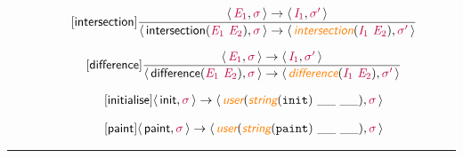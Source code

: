 \documentclass[10pt,leqno,fleqn]{article}
\newcommand{\artVariable}[1]{\mbox{\color{purple}\em #1\/}}
\newcommand{\artConstructor}[1]{\mbox{\sf #1}}
\newcommand{\artCaseInsensitiveLiteral}[1]{\mbox{\tt #1}}
\newcommand{\artSpecial}[1]{\mbox{\color{orange}\sf\em #1}}
\begin{document}
\begin{equation}
\tag*{[\artConstructor{\sf intersection}]}
\begin{split}\frac{\langle\, \artVariable{E$_{1}$}, \artVariable{$\sigma$}\,\rangle \rightarrow \langle\, \artVariable{I$_{1}$}, \artVariable{$\sigma$\/$^\prime$}\,\rangle }{\langle\, \artConstructor{\sf intersection}(\artVariable{E$_{1}$}\ \artVariable{E$_{2}$}), \artVariable{$\sigma$}\,\rangle \rightarrow \langle\, \artSpecial{intersection}(\artVariable{I$_{1}$}\ \artVariable{E$_{2}$}), \artVariable{$\sigma$\/$^\prime$}\,\rangle }
\end{split}
\end{equation}

\begin{equation}
\tag*{[\artConstructor{\sf difference}]}
\begin{split}\frac{\langle\, \artVariable{E$_{1}$}, \artVariable{$\sigma$}\,\rangle \rightarrow \langle\, \artVariable{I$_{1}$}, \artVariable{$\sigma$\/$^\prime$}\,\rangle }{\langle\, \artConstructor{\sf difference}(\artVariable{E$_{1}$}\ \artVariable{E$_{2}$}), \artVariable{$\sigma$}\,\rangle \rightarrow \langle\, \artSpecial{difference}(\artVariable{I$_{1}$}\ \artVariable{E$_{2}$}), \artVariable{$\sigma$\/$^\prime$}\,\rangle }
\end{split}
\end{equation}

\begin{equation}
\tag*{[\artConstructor{\sf initialise}]}
\begin{split}\langle\, \artConstructor{\sf init}, \artVariable{$\sigma$}\,\rangle \rightarrow \langle\, \artSpecial{user}(\artSpecial{string}(\artCaseInsensitiveLiteral{init})\ \_\_\ \_\_), \artVariable{$\sigma$}\,\rangle 
\end{split}
\end{equation}

\begin{equation}
\tag*{[\artConstructor{\sf paint}]}
\begin{split}\langle\, \artConstructor{\sf paint}, \artVariable{$\sigma$}\,\rangle \rightarrow \langle\, \artSpecial{user}(\artSpecial{string}(\artCaseInsensitiveLiteral{paint})\ \_\_\ \_\_), \artVariable{$\sigma$}\,\rangle 
\end{split}
\end{equation}

\hrule
\end{document}
